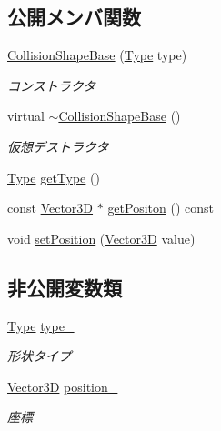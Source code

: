 \subsection*{公開メンバ関数}
\begin{DoxyCompactItemize}
\item 
\mbox{\hyperlink{class_collision_shape_base_a9dd2ab42e2a6e96c6bff832ce8ca62b9}{Collision\+Shape\+Base}} (\mbox{\hyperlink{class_collision_shape_base_a8abcef092855ad0ca191047044b002cb}{Type}} type)
\begin{DoxyCompactList}\small\item\em コンストラクタ \end{DoxyCompactList}\item 
virtual \mbox{\hyperlink{class_collision_shape_base_a64fa9e1ae6b582be42360e926ce5d6cb}{$\sim$\+Collision\+Shape\+Base}} ()
\begin{DoxyCompactList}\small\item\em 仮想デストラクタ \end{DoxyCompactList}\item 
\mbox{\hyperlink{class_collision_shape_base_a8abcef092855ad0ca191047044b002cb}{Type}} \mbox{\hyperlink{class_collision_shape_base_a662af47ebcd9f29d7c54047a0227b8bc}{get\+Type}} ()
\item 
const \mbox{\hyperlink{class_vector3_d}{Vector3D}} $\ast$ \mbox{\hyperlink{class_collision_shape_base_a17bd2d81ebf464459dd977152e02055b}{get\+Positon}} () const
\item 
void \mbox{\hyperlink{class_collision_shape_base_ac14132139e486926df11f438a8600907}{set\+Position}} (\mbox{\hyperlink{class_vector3_d}{Vector3D}} value)
\end{DoxyCompactItemize}
\subsection*{非公開変数類}
\begin{DoxyCompactItemize}
\item 
\mbox{\hyperlink{class_collision_shape_base_a8abcef092855ad0ca191047044b002cb}{Type}} \mbox{\hyperlink{class_collision_shape_base_a46413b1e4d4b3a35075232fa9012addb}{type\+\_\+}}
\begin{DoxyCompactList}\small\item\em 形状タイプ \end{DoxyCompactList}\item 
\mbox{\hyperlink{class_vector3_d}{Vector3D}} \mbox{\hyperlink{class_collision_shape_base_a0a60d112797f3026af9cbe79badbc66b}{position\+\_\+}}
\begin{DoxyCompactList}\small\item\em 座標 \end{DoxyCompactList}\end{DoxyCompactItemize}


